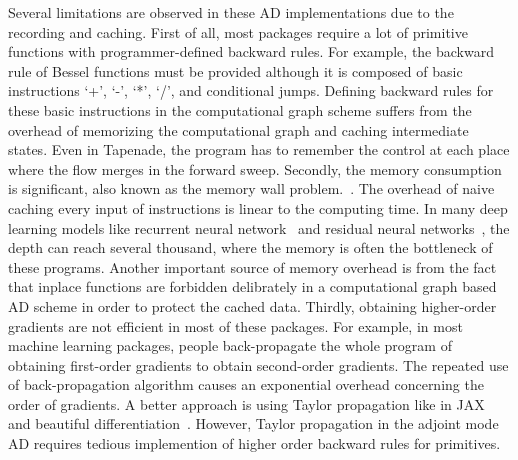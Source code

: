 \documentclass[aps,twocolumn,longbibliography,english,superscriptaddress]{revtex4-1}
\newcommand{\<}{\langle}
\renewcommand{\>}{\rangle}
\theoremstyle{definition}\newtheorem{definition}{\textit{Definition}}
\begin{document}
    Several limitations are observed in these AD implementations due to the recording and caching. First of all, most packages require a lot of primitive functions with programmer-defined backward rules. For example, the backward rule of Bessel functions must be provided although it is composed of basic instructions `+', `-', `*', `/', and conditional jumps. Defining backward rules for these basic instructions in the computational graph scheme suffers from the overhead of memorizing the computational graph and caching intermediate states. Even in Tapenade, the program has to remember the control at each place where the flow merges in the forward sweep. %
    Secondly, the memory consumption is significant, also known as the memory wall problem.~\cite{memorywall}. The overhead of naive caching every input of instructions is linear to the computing time. In many deep learning models like recurrent neural network~\cite{Lipton2015} and residual neural networks~\cite{He2016}, the depth can reach several thousand, where the memory is often the bottleneck of these programs. Another important source of memory overhead is from the fact that inplace functions are forbidden delibrately in a computational graph based AD scheme in order to protect the cached data.
    Thirdly, obtaining higher-order gradients are not efficient in most of these packages. For example, in most machine learning packages, people back-propagate the whole program of obtaining first-order gradients to obtain second-order gradients. The repeated use of back-propagation algorithm causes an exponential overhead concerning the order of gradients. A better approach is using Taylor propagation like in JAX~\cite{Bettencourt2019} and beautiful differentiation~\cite{Elliott2009}. However, Taylor propagation in the adjoint mode AD requires tedious implemention of higher order backward rules for primitives.


\end{document}
